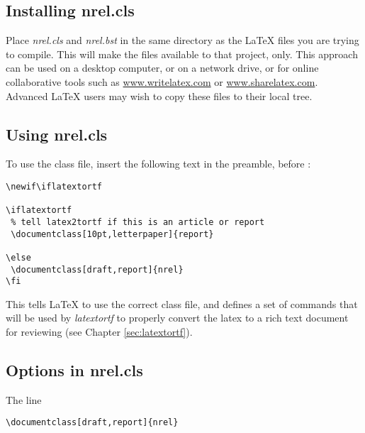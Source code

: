 \subsection{Installing nrel.cls}
Place \emph{nrel.cls} and \emph{nrel.bst} in the same directory as the LaTeX files you are trying to compile. This will make the files available to that project, only. This approach can be used on a desktop computer, or on a network drive, or for online collaborative tools such as \href{www.writelatex.com}{www.writelatex.com} or \href{www.sharelatex.com}{www.sharelatex.com}. Advanced LaTeX users may wish to copy these files to their local tree.

\subsection{Using nrel.cls}
To use the class file, insert the following text in the preamble, before \verb++:

\begin{verbatim}
\newif\iflatextortf

\iflatextortf
 % tell latex2tortf if this is an article or report
 \documentclass[10pt,letterpaper]{report}
 
\else
 \documentclass[draft,report]{nrel} 
\fi
\end{verbatim}

This tells LaTeX to use the correct class file, and defines a set of commands that will be used by \emph{latextortf} to properly convert the latex to a rich text document for reviewing (see Chapter \ref{sec:latextortf}).

\subsection{Options in nrel.cls}\label{sec:nrel.cls.options}
The line

\begin{verbatim}
\documentclass[draft,report]{nrel}
\end{verbatim}

